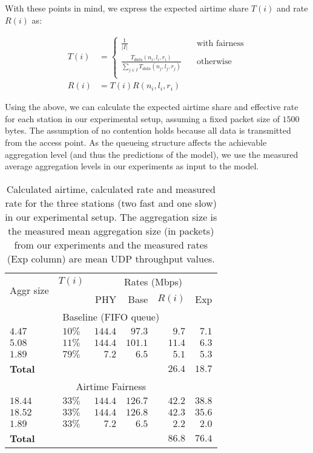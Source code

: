 \documentclass[english]{scrartcl}
\begin{document}
With these points in mind, we express the expected airtime share \(T(i)\) and rate
\(R(i)\) as:

\begin{align}
T(i) &=
  \begin{cases}
    \frac{1}{|I|} & \quad \text{with fairness} \\
    \frac{T_{data}(n_i,l_i,r_i)}{\sum_{j\in I} T_{data}(n_j,l_j,r_j)} & \quad \text{otherwise} \\
  \end{cases} \\
R(i) &= T(i) R(n_i,l_i,r_i)
\end{align}


Using the above, we can calculate the expected airtime share and effective rate
for each station in our experimental setup, assuming a fixed packet size of
\(1500\) bytes. The assumption of no contention holds because all data is
transmitted from the access point. As the queueing structure affects the
achievable aggregation level (and thus the predictions of the model), we use the
measured average aggregation levels in our experiments as input to the model.

\begin{table}[htb]
\centering
\small
\begin{tabular}{lcrrrr}
\toprule
\multirow{2}{6mm}{Aggr size} & $T(i)$ & \multicolumn{4}{c}{Rates (Mbps)} \\ \cmidrule{3-6}
 &  & PHY & Base & $R(i)$ & Exp\\
\midrule
\multicolumn{6}{c}{Baseline (FIFO queue)\footnotemark[2]} \\
$4.47$ &  $10\%$ & $144.4$ & $97.3$ & $9.7$ & $7.1$ \\
$5.08$ &  $11\%$ & $144.4$ & $101.1$ & $11.4$ & $6.3$ \\
$1.89$ &  $79\%$ & $7.2$ & $6.5$ & $5.1$    & $5.3$\\ \cmidrule{5-6}
\multicolumn{4}{l}{\textbf{Total}} & $26.4$ & $18.7$ \\
\midrule
\multicolumn{6}{c}{Airtime Fairness} \\
$18.44$ &  $33\%$ & $144.4$ & $126.7$ & $42.2$ & $38.8$\\
$18.52$ &  $33\%$ & $144.4$ & $126.8$ & $42.3$ & $35.6$\\
$1.89$ &  $33\%$ & $7.2$ & $6.5$ & $2.2$       & $2.0$\\  \cmidrule{5-6}
\multicolumn{4}{l}{\textbf{Total}} & $86.8$ & $76.4$ \\
\bottomrule
\end{tabular}
\caption{\label{tbl:airtime-rates}\small
Calculated airtime, calculated rate and measured rate for the three stations (two fast
and one slow) in our experimental setup. The aggregation size is the measured
mean aggregation size (in packets) from our experiments and the measured rates
(Exp column) are mean UDP throughput values.}
\end{table}
\end{document}
